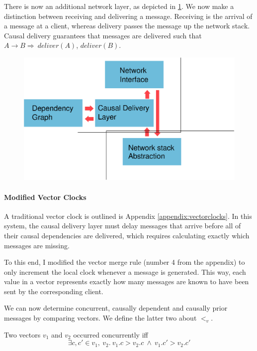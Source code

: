 \documentclass[12pt,a4paper,twoside,openright]{report}
\begin{document}
		There is now an additional network layer, as depicted in \ref{fig:causal}. We now make a distinction between receiving and delivering a message. Receiving is the arrival of a message at a client, whereas delivery passes the message up the network stack. Causal delivery guarantees that messages are delivered such that $A \rightarrow B \Rightarrow\ deliver(A)$, $deliver(B)$.
		
				
	\begin{figure}[H]
	\centering
	\includegraphics[width=1\linewidth]{figs/causal_arch.eps}
	\caption[Ensuring Causal Delivery]{}
	\label{fig:causal}
	\end{figure}

	
		\paragraph{Modified Vector Clocks}
		A traditional vector clock is outlined is Appendix \ref{appendix:vectorclocks}. In this system, the causal delivery layer must delay messages that arrive before all of their causal dependencies are delivered, which requires calculating exactly which messages are missing.
		
		To this end, I modified the vector merge rule (number 4 from the appendix) to only increment the local clock whenever a message is generated. This way, each value in a vector represents exactly how many messages are known to have been sent by the corresponding client. 
		
		We can now determine concurrent, causally dependent and causally prior messages by comparing vectors. We define the latter two about $<_v$.
				
		Two vectors $v_1$ and $v_2$ occurred concurrently iff \[\exists c,c' \in v_1,\ v_2.\ v_1.c > v_2.c\ \land\ v_1.c' > v_2.c'\]
		
\end{document}
